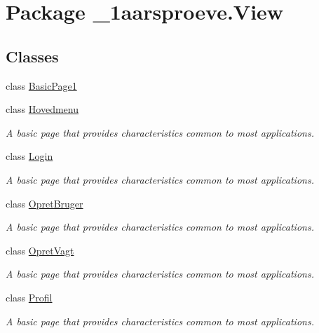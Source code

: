 \hypertarget{namespace__1aarsproeve_1_1_view}{}\section{Package \+\_\+1aarsproeve.\+View}
\label{namespace__1aarsproeve_1_1_view}
\subsection*{Classes}
\begin{DoxyCompactItemize}
\item 
class \hyperlink{class__1aarsproeve_1_1_view_1_1_basic_page1}{Basic\+Page1}
\item 
class \hyperlink{class__1aarsproeve_1_1_view_1_1_hovedmenu}{Hovedmenu}
\begin{DoxyCompactList}\small\item\em A basic page that provides characteristics common to most applications. \end{DoxyCompactList}\item 
class \hyperlink{class__1aarsproeve_1_1_view_1_1_login}{Login}
\begin{DoxyCompactList}\small\item\em A basic page that provides characteristics common to most applications. \end{DoxyCompactList}\item 
class \hyperlink{class__1aarsproeve_1_1_view_1_1_opret_bruger}{Opret\+Bruger}
\begin{DoxyCompactList}\small\item\em A basic page that provides characteristics common to most applications. \end{DoxyCompactList}\item 
class \hyperlink{class__1aarsproeve_1_1_view_1_1_opret_vagt}{Opret\+Vagt}
\begin{DoxyCompactList}\small\item\em A basic page that provides characteristics common to most applications. \end{DoxyCompactList}\item 
class \hyperlink{class__1aarsproeve_1_1_view_1_1_profil}{Profil}
\begin{DoxyCompactList}\small\item\em A basic page that provides characteristics common to most applications. \end{DoxyCompactList}\item 

\end{DoxyCompactItemize}
